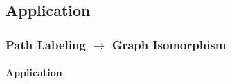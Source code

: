 \documentclass[12pt,
               color={usenames,   %
                      dvipsnames},%
                    ]{beamer}
\begin{document}
\subsection{Application}
\frame
{
    \frametitle{Path Labeling $\rightarrow$  Graph Isomorphism}
    \framesubtitle{Application} 


 \note{}
}
\end{document}
